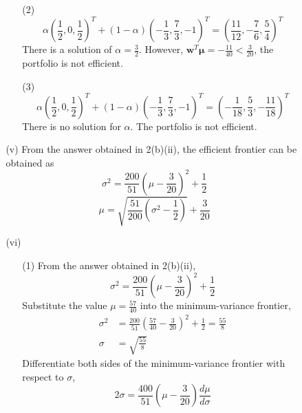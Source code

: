 \documentclass{article}
\begin{document}
\begin{enumerate}
\begin{itemize}
\begin{itemize}
\begin{itemize}
\item[(2)]
\[\alpha \left(\frac{1}{2},0,\frac{1}{2}\right)^T+(1-\alpha) \left(-\frac{1}{3},\frac{7}{3},-1\right)^T=\left(\frac{11}{12},-\frac{7}{6},\frac{5}{4}\right)^T\]
There is a solution of $\alpha=\frac{3}{2}$. However, $\mathbf{w}^T\boldsymbol\mu=-\frac{11}{40}<\frac{3}{20}$, the portfolio is not efficient.
\item[(3)]
\[\alpha \left(\frac{1}{2},0,\frac{1}{2}\right)^T+(1-\alpha) \left(-\frac{1}{3},\frac{7}{3},-1\right)^T=\left(-\frac{1}{18},\frac{5}{3},-\frac{11}{18}\right)^T\]
There is no solution for $\alpha$. The portfolio is not efficient.\\

\end{itemize}
\item[(v)]
From the answer obtained in 2(b)(ii), the efficient frontier can be obtained as
\[\sigma^2=\frac{200}{51}\left(\mu-\frac{3}{20}\right)^2+\frac{1}{2}\]
\[\mu=\sqrt{\frac{51}{200}\left(\sigma^2-\frac{1}{2}\right)}+\frac{3}{20}\]

\item[(vi)]
\begin{itemize}
\item[(1)]
From the answer obtained in 2(b)(ii),
\[\sigma^2=\frac{200}{51}\left(\mu-\frac{3}{20}\right)^2+\frac{1}{2}\]
Substitute the value $\mu=\frac{57}{40}$ into the minimum-variance frontier,
\begin{align*}
\sigma^2&=\frac{200}{51}\left(\frac{57}{40}-\frac{3}{20}\right)^2+\frac{1}{2}=\frac{55}{8} \\
\sigma&=\sqrt{\frac{55}{8}}
\end{align*}
Differentiate both sides of the minimum-variance frontier with respect to $\sigma$,
\[2\sigma=\frac{400}{51}\left(\mu-\frac{3}{20}\right)\frac{d\mu}{d\sigma}\]


\end{itemize}
\end{itemize}
\end{itemize}
\end{enumerate}
\end{document}
